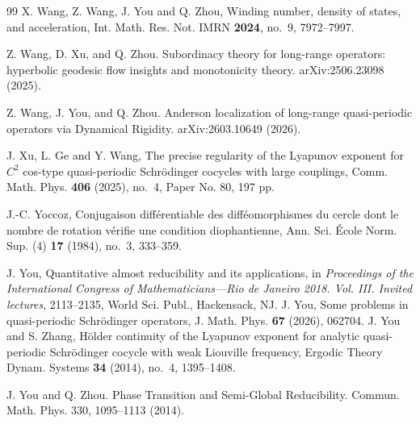 \documentclass[reqno,11pt]{amsart}
\begin{document}
\begin{thebibliography}{99}
X. Wang, Z. Wang, J. You and Q. Zhou, Winding number, density of states, and acceleration, Int. Math. Res. Not. IMRN {\bf 2024}, no.~9, 7972--7997.

Z. Wang, D. Xu, and Q. Zhou. Subordinacy theory for long-range operators: hyperbolic geodesic flow insights and monotonicity theory. arXiv:2506.23098 (2025).

Z. Wang, J. You, and Q. Zhou. Anderson localization of long-range quasi-periodic operators via Dynamical Rigidity. arXiv:2603.10649 (2026).

J. Xu, L. Ge and Y. Wang, The precise regularity of the Lyapunov exponent for $C^2$ cos-type quasi-periodic Schr\"odinger cocycles with large couplings, Comm. Math. Phys. {\bf 406} (2025), no.~4, Paper No. 80, 197 pp.

J.-C. Yoccoz, Conjugaison diff\'erentiable des diff\'eomorphismes du cercle dont le nombre de rotation v\'erifie une condition diophantienne, Ann. Sci. \'Ecole Norm. Sup. (4) {\bf 17} (1984), no.~3, 333--359.

J. You, Quantitative almost reducibility and its applications, in {\it Proceedings of the International Congress of Mathematicians---Rio de Janeiro 2018. Vol. III. Invited lectures}, 2113--2135, World Sci. Publ., Hackensack, NJ.
J. You, Some problems in quasi-periodic Schr\"odinger operators, J. Math. Phys. {\bf 67} (2026), 062704.
J. You and S. Zhang, H\"older continuity of the Lyapunov exponent for analytic quasi-periodic Schr\"odinger cocycle with weak Liouville frequency, Ergodic Theory Dynam. Systems {\bf 34} (2014), no.~4, 1395--1408.

 J. You and Q. Zhou. Phase Transition and Semi-Global Reducibility. Commun. Math. Phys. 330, 1095–1113 (2014). 

\end{thebibliography}
\end{document}
